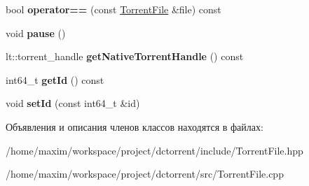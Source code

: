 \begin{DoxyCompactItemize}
\item 
\mbox{\label{class_torrent_file_a1c08dc50fd62ab94752ef59e848a2963}} 
bool {\bfseries operator==} (const \hyperlink{class_torrent_file}{Torrent\+File} \&file) const
\item 
\mbox{\label{class_torrent_file_a3a45110028c23fd44b9852dd6f2407bf}} 
void {\bfseries pause} ()
\item 
\mbox{\label{class_torrent_file_a7e1f048d2dfa195638155d62fe5ab02c}} 
lt\+::torrent\+\_\+handle {\bfseries get\+Native\+Torrent\+Handle} () const
\item 
\mbox{\label{class_torrent_file_ade6c6fe4d6214f2ce004b40532746dba}} 
int64\+\_\+t {\bfseries get\+Id} () const
\item 
\mbox{\label{class_torrent_file_a757e86a747ebcb13bd57cf4de1c9d013}} 
void {\bfseries set\+Id} (const int64\+\_\+t \&id)
\end{DoxyCompactItemize}


Объявления и описания членов классов находятся в файлах\+:\begin{DoxyCompactItemize}
\item 
/home/maxim/workspace/project/dctorrent/include/Torrent\+File.\+hpp\item 
/home/maxim/workspace/project/dctorrent/src/Torrent\+File.\+cpp\end{DoxyCompactItemize}
